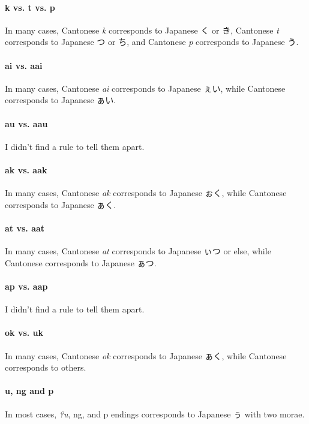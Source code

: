 \documentclass{article}
\begin{document}
\paragraph*{k vs. t vs. p}%
In many cases, Cantonese \textit{k} corresponds to Japanese く or き, Cantonese \textit{t} corresponds to Japanese つ or ち, and Cantonese \textit{p} corresponds to Japanese う.

\paragraph*{ai vs. aai}%
In many cases, Cantonese \textit{ai} corresponds to Japanese ぇい, while Cantonese  corresponds to Japanese ぁい.

\paragraph*{au vs. aau}%
I didn't find a rule to tell them apart.

\paragraph*{ak vs. aak}%
In many cases, Cantonese \textit{ak} corresponds to Japanese ぉく, while Cantonese  corresponds to Japanese ぁく.

\paragraph*{at vs. aat}%
In many cases, Cantonese \textit{at} corresponds to Japanese ぃつ or else, while Cantonese  corresponds to Japanese ぁつ.

\paragraph*{ap vs. aap}%
I didn't find a rule to tell them apart.

\paragraph*{ok vs. uk}%
In many cases, Cantonese \textit{ok} corresponds to Japanese ぁく, while Cantonese  corresponds to others.

\paragraph*{u, ng and p}%
In most cases, \textit{?u}, ng, and p endings corresponds to Japanese ぅ with two morae.
\end{document}
